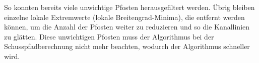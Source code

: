So konnten bereits viele unwichtige Pfosten herausgefiltert werden. Übrig bleiben einzelne lokale Extremwerte (lokale Breitengrad-Minima), die entfernt werden können, um die Anzahl der Pfosten weiter zu reduzieren und so die Kanallinien zu glätten. Diese unwichtigen Pfosten muss der Algorithmus bei der Schusspfadberechnung nicht mehr beachten, wodurch der Algorithmus schneller wird. 
